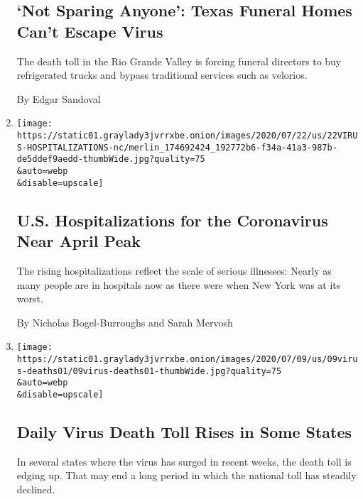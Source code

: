 \begin{enumerate}
  \hypertarget{not-sparing-anyone-texas-funeral-homes-cant-escape-virus}{%
  \subsection{`Not Sparing Anyone': Texas Funeral Homes Can't Escape
  Virus}\label{not-sparing-anyone-texas-funeral-homes-cant-escape-virus}}

  The death toll in the Rio Grande Valley is forcing funeral directors
  to buy refrigerated trucks and bypass traditional services such as
  velorios.

  By Edgar Sandoval
\item
  \href{/2020/07/22/us/coronavirus-hospitalizations-near-peak.html}{}

  \texttt{[image: https://static01.graylady3jvrrxbe.onion/images/2020/07/22/us/22VIRUS-HOSPITALIZATIONS-nc/merlin\_174692424\_192772b6-f34a-41a3-987b-de5ddef9aedd-thumbWide.jpg?quality=75\\\&auto=webp\\\&disable=upscale]}

  \hypertarget{us-hospitalizations-for-the-coronavirus-near-april-peak}{%
  \subsection{U.S. Hospitalizations for the Coronavirus Near April
  Peak}\label{us-hospitalizations-for-the-coronavirus-near-april-peak}}

  The rising hospitalizations reflect the scale of serious illnesses:
  Nearly as many people are in hospitals now as there were when New York
  was at its worst.

  By Nicholas Bogel-Burroughs and Sarah Mervosh
\item
  \href{/2020/07/10/us/daily-virus-death-toll-rises-in-some-states.html}{}

  \texttt{[image: https://static01.graylady3jvrrxbe.onion/images/2020/07/09/us/09virus-deaths01/09virus-deaths01-thumbWide.jpg?quality=75\\\&auto=webp\\\&disable=upscale]}

  \hypertarget{daily-virus-death-toll-rises-in-some-states}{%
  \subsection{Daily Virus Death Toll Rises in Some
  States}\label{daily-virus-death-toll-rises-in-some-states}}

  In several states where the virus has surged in recent weeks, the
  death toll is edging up. That may end a long period in which the
  national toll has steadily declined.


\end{enumerate}
